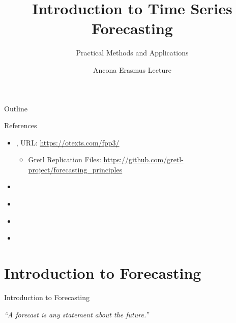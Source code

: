\documentclass[11pt]{beamer}
\title{Introduction to Time Series Forecasting}
\subtitle{Practical Methods and Applications}
\date{Ancona Erasmus Lecture}
\begin{document}
\begin{frame}
	\titlepage
\end{frame}

\begin{frame}[fragile]{Outline}
	\tableofcontents
\end{frame}

\begin{frame}[fragile]{References}
	\begin{itemize}
		\item \citet{hyndman2021ForecastingPrinciplesPractice}, URL: \url{https://otexts.com/fpp3/}
		\begin{itemize}
			\item Gretl Replication Files: \url{https://github.com/gretl-project/forecasting_principles}
		\end{itemize}
		\item \citet{castelForecastingEssentialIntroduction2019}
		\item \citet{diebold2024ForecastingEconomicsBusiness}
		\item \citet{elliott2016EconomicForecasting}
		\item \citet{enders2015AppliedEconometricTime}
	\end{itemize}
\end{frame}


\section{Introduction to Forecasting}

\begin{frame}
	\begin{center}
		\Large
		Introduction to Forecasting
		\vspace{1cm}

		\textit{``A forecast is any statement about the future.''}
		\vspace{0.25cm}

		\scriptsize{\citet{castelForecastingEssentialIntroduction2019}}
	\end{center}
\end{frame}
\end{document}
